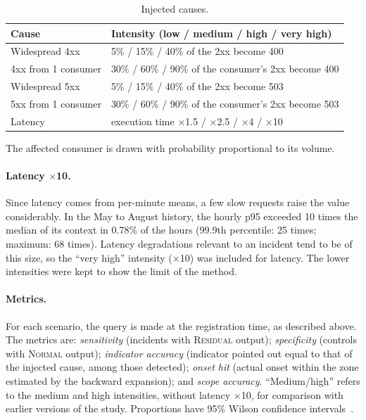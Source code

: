\documentclass[sigconf,nonacm]{acmart}
\newcommand{\Normal}{\textsc{Normal}\xspace}
\newcommand{\Residual}{\textsc{Residual}\xspace}
\begin{document}
\begin{table}[t]
  \caption{Injected causes.}
  \label{tab:falhas}
  \small
  \begin{tabular}{p{}p{}}
    \toprule
    Cause & Intensity (low / medium / high / very high) \\
    \midrule
    Widespread 4xx & 5\% / 15\% / 40\% of the 2xx become 400 \\
    4xx from 1 consumer & 30\% / 60\% / 90\% of the consumer's 2xx become 400 \\
    Widespread 5xx & 5\% / 15\% / 40\% of the 2xx become 503 \\
    5xx from 1 consumer & 30\% / 60\% / 90\% of the consumer's 2xx become 503 \\
    Latency & execution time $\times$1.5 / $\times$2.5 / $\times$4 / $\times$10 \\
    \bottomrule
  \end{tabular}
  \par\smallskip\footnotesize The affected consumer is drawn with probability proportional to its volume.
\end{table}

\paragraph{Latency $\times$10.} Since latency comes from per-minute means, a few slow requests raise the value considerably. In the May to August history, the hourly p95 exceeded 10 times the median of its context in 0.78\% of the hours (99.9th percentile: 25 times; maximum: 68 times). Latency degradations relevant to an incident tend to be of this size, so the ``very high'' intensity ($\times$10) was included for latency. The lower intensities were kept to show the limit of the method.

\paragraph{Metrics.} For each scenario, the query is made at the registration time, as described above. The metrics are: \emph{sensitivity} (incidents with \Residual output); \emph{specificity} (controls with \Normal output); \emph{indicator accuracy} (indicator pointed out equal to that of the injected cause, among those detected); \emph{onset hit} (actual onset within the zone estimated by the backward expansion); and \emph{scope accuracy}. ``Medium/high'' refers to the medium and high intensities, without latency $\times$10, for comparison with earlier versions of the study. Proportions have 95\% Wilson confidence intervals~\citep{wilson1927probable}.
\end{document}
